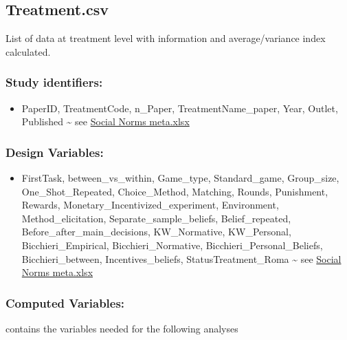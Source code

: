 \documentclass[
]{article}
\providecommand{\tightlist}{%
  \setlength{\itemsep}{0pt}\setlength{\parskip}{0pt}}
\begin{document}
\hypertarget{treatment.csv}{%
\subsection{Treatment.csv}\label{treatment.csv}}

List of data at treatment level with information and average/variance
index calculated.

\hypertarget{study-identifiers}{%
\subsubsection{Study identifiers:}\label{study-identifiers}}

\begin{itemize}
\tightlist
\item
  PaperID, TreatmentCode, n\_Paper, TreatmentName\_paper, Year, Outlet,
  Published \textasciitilde{} see
  \protect\hyperlink{Study_identifiers}{Social Norms meta.xlsx}
\end{itemize}

\hypertarget{design-variables-1}{%
\subsubsection{Design Variables:}\label{design-variables-1}}

\begin{itemize}
\tightlist
\item
  FirstTask, between\_vs\_within, Game\_type, Standard\_game,
  Group\_size, One\_Shot\_Repeated, Choice\_Method, Matching, Rounds,
  Punishment, Rewards, Monetary\_Incentivized\_experiment, Environment,
  Method\_elicitation, Separate\_sample\_beliefs, Belief\_repeated,
  Before\_after\_main\_decisions, KW\_Normative, KW\_Personal,
  Bicchieri\_Empirical, Bicchieri\_Normative,
  Bicchieri\_Personal\_Beliefs, Bicchieri\_between, Incentives\_beliefs,
  StatusTreatment\_Roma \textasciitilde{} see
  \protect\hyperlink{Study_identifiers}{Social Norms meta.xlsx}
\end{itemize}

\hypertarget{computed-variables}{%
\subsubsection{Computed Variables:}\label{computed-variables}}

contains the variables needed for the following analyses
\end{document}
